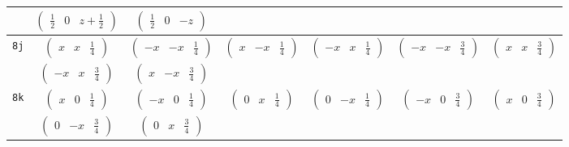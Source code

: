 \documentclass[fleqn,9pt,landscape]{jsarticle}
\begin{document}
\begin{center}
\begin{longtable}{ccccccc}
& $ \begin{pmatrix} \frac{1}{2} & 0 & z + \frac{1}{2} \end{pmatrix} $ & $ \begin{pmatrix} \frac{1}{2} & 0 & - z \end{pmatrix} $ & $  $ & $  $ & $  $ & $  $ \\ \hline
{\tt 8j} & $ \begin{pmatrix} x & x & \frac{1}{4} \end{pmatrix} $ & $ \begin{pmatrix} - x & - x & \frac{1}{4} \end{pmatrix} $ & $ \begin{pmatrix} x & - x & \frac{1}{4} \end{pmatrix} $ & $ \begin{pmatrix} - x & x & \frac{1}{4} \end{pmatrix} $ & $ \begin{pmatrix} - x & - x & \frac{3}{4} \end{pmatrix} $ & $ \begin{pmatrix} x & x & \frac{3}{4} \end{pmatrix} $ \\
& $ \begin{pmatrix} - x & x & \frac{3}{4} \end{pmatrix} $ & $ \begin{pmatrix} x & - x & \frac{3}{4} \end{pmatrix} $ & $  $ & $  $ & $  $ & $  $ \\ \hline
{\tt 8k} & $ \begin{pmatrix} x & 0 & \frac{1}{4} \end{pmatrix} $ & $ \begin{pmatrix} - x & 0 & \frac{1}{4} \end{pmatrix} $ & $ \begin{pmatrix} 0 & x & \frac{1}{4} \end{pmatrix} $ & $ \begin{pmatrix} 0 & - x & \frac{1}{4} \end{pmatrix} $ & $ \begin{pmatrix} - x & 0 & \frac{3}{4} \end{pmatrix} $ & $ \begin{pmatrix} x & 0 & \frac{3}{4} \end{pmatrix} $ \\
& $ \begin{pmatrix} 0 & - x & \frac{3}{4} \end{pmatrix} $ & $ \begin{pmatrix} 0 & x & \frac{3}{4} \end{pmatrix} $ & $  $ & $  $ & $  $ & $  $ \\ \hline

\end{longtable}
\end{center}
\end{document}
